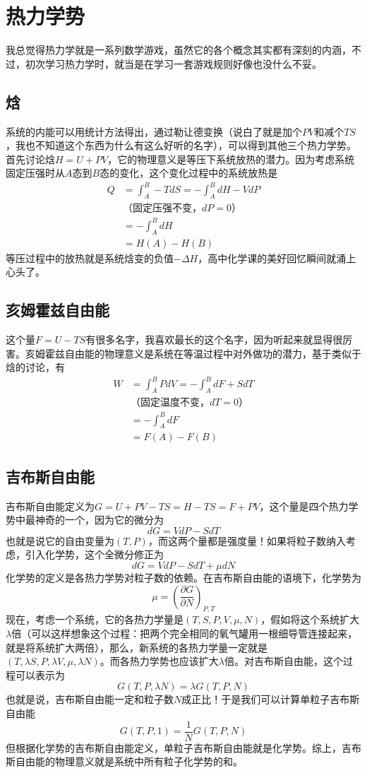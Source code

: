 \documentclass[a4paper,11pt]{ctexart}
\newcommand{\beq}{\begin{equation}}
\newcommand{\eeq}{\end{equation}}
\newcommand{\bea}{\begin{equation}\begin{aligned}}
\newcommand{\eea}{\end{aligned}\end{equation}}
\newcommand{\red}{\color{red}}
\begin{document}
\section{热力学势}
我总觉得热力学就是一系列数学游戏，虽然它的各个概念其实都有深刻的内涵，不过，初次学习热力学时，就当是在学习一套游戏规则好像也没什么不妥。
\subsection{焓}
系统的内能可以用统计方法得出，通过勒让德变换（说白了就是加个$PV$和减个$TS$，我也不知道这个东西为什么有这么好听的名字），可以得到其他三个热力学势。首先讨论焓$H = U + PV$，它的物理意义是等压下{\red 系统放热的潜力}。因为考虑系统固定压强时从$A$态到$B$态的变化，这个变化过程中的系统放热是
\bea
Q &= \int_A^B -TdS = -\int_A^B dH - VdP \\
&\text{（固定压强不变，$dP = 0$）} \\
&= -\int_A^B dH \\
&= H(A) - H(B)
\eea
等压过程中的放热就是系统焓变的负值$-\Delta H$，高中化学课的美好回忆瞬间就涌上心头了。
\subsection{亥姆霍兹自由能}
这个量$F = U - TS$有很多名字，我喜欢最长的这个名字，因为听起来就显得很厉害。亥姆霍兹自由能的物理意义是系统在等温过程中{\red 对外做功的潜力}，基于类似于焓的讨论，有
\bea
W &= \int_A^B PdV = -\int_A^B dF + SdT \\
&\text{（固定温度不变，$dT = 0$）} \\
&= -\int_A^B dF \\
&= F(A) - F(B)
\eea
\subsection{吉布斯自由能}
吉布斯自由能定义为$G = U + PV - TS = H - TS = F + PV$，这个量是四个热力学势中最神奇的一个，因为它的微分为
\beq
dG = VdP - SdT
\eeq
也就是说它的自由变量为$(T,P)$，而这两个量都是强度量！如果将粒子数纳入考虑，引入化学势，这个全微分修正为
\beq
dG = VdP - SdT + \mu dN
\eeq
化学势的定义是各热力学势对粒子数的依赖。在吉布斯自由能的语境下，化学势为
\beq
\mu = (\frac{\partial G}{\partial N})_{P,T}
\eeq
现在，考虑一个系统，它的各热力学量是$(T,S,P,V,\mu,N)$，假如将这个系统扩大$\lambda$倍（可以这样想象这个过程：把两个完全相同的氧气罐用一根细导管连接起来，就是将系统扩大两倍），那么，新系统的各热力学量一定就是$(T,\lambda S,P,\lambda V,\mu,\lambda N)$。而各热力学势也应该扩大$\lambda$倍。对吉布斯自由能，这个过程可以表示为
\beq
G(T,P,\lambda N) = \lambda G(T,P,N)
\eeq
也就是说，{\red 吉布斯自由能一定和粒子数$N$成正比}！于是我们可以计算单粒子吉布斯自由能
\beq
G(T,P,1) = \frac{1}{N} G(T,P,N)
\eeq
但根据化学势的吉布斯自由能定义，{\red 单粒子吉布斯自由能就是化学势}。综上，吉布斯自由能的物理意义就是系统中所有粒子化学势的和。
\end{document}
